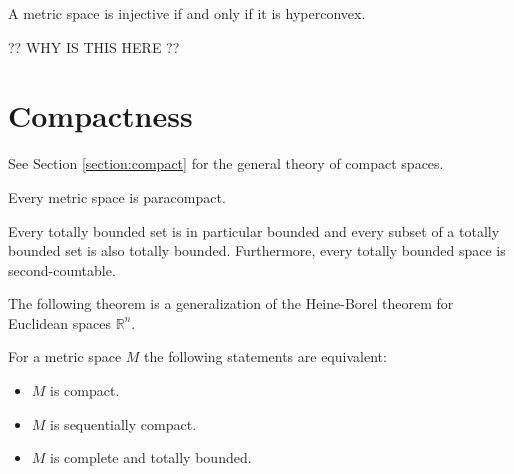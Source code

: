 
    \begin{theorem}
        A metric space is injective if and only if it is hyperconvex.
    \end{theorem}

    ?? WHY IS THIS HERE ??

\section{Compactness}

    See Section \ref{section:compact} for the general theory of compact spaces.

    \begin{theorem}[Stone]
        Every metric space is paracompact.
    \end{theorem}

    \begin{property}[Boundedness]
        Every totally bounded set is in particular bounded and every subset of a totally bounded set is also totally bounded. Furthermore, every totally bounded space is second-countable.
    \end{property}

    The following theorem is a generalization of the Heine-Borel theorem for Euclidean spaces $\mathbb{R}^n$.
    \begin{theorem}
        For a metric space $M$ the following statements are equivalent:
        \begin{itemize}
            \item $M$ is compact.
            \item $M$ is sequentially compact.
            \item $M$ is complete and totally bounded.
        \end{itemize}
    \end{theorem}

